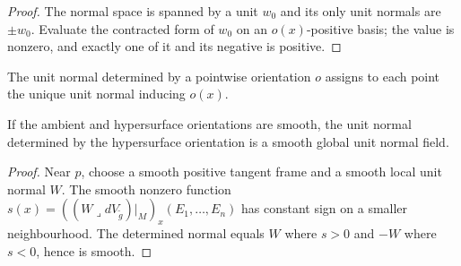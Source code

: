 \begin{proof}

\sketch The normal space is spanned by a unit $w_0$ and its only unit normals are $\pm w_0$. Evaluate the contracted form of $w_0$ on an $o(x)$-positive basis; the value is nonzero, and exactly one of it and its negative is positive.
\end{proof}

\begin{definition}
\label{def:unit-normal-of-orientation}





The unit normal determined by a pointwise orientation $o$ assigns to each point the unique unit normal inducing $o(x)$.
\end{definition}

\begin{proposition}
\label{prop:unit-normal-of-orientation-smooth}





If the ambient and hypersurface orientations are smooth, the unit normal determined by the hypersurface orientation is a smooth global unit normal field.
\end{proposition}

\begin{proof}

\sketch Near $p$, choose a smooth positive tangent frame and a smooth local unit normal $W$. The smooth nonzero function $s(x)=((W\lrcorner dV_{\widetilde g})|_M)_x(E_1,\ldots,E_n)$ has constant sign on a smaller neighbourhood. The determined normal equals $W$ where $s>0$ and $-W$ where $s<0$, hence is smooth.
\end{proof}

